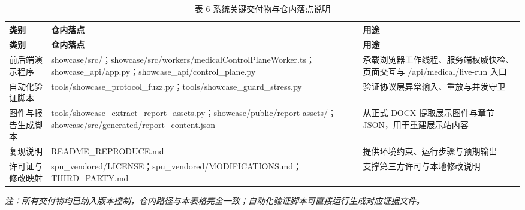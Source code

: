 \begin{longtable}{>{\raggedright\arraybackslash}p{}>{\raggedright\arraybackslash}p{}>{\raggedright\arraybackslash}p{}}
\caption{表 6 系统关键交付物与仓内落点说明}\\
\toprule
\textbf{类别} & \textbf{仓内落点} & \textbf{用途} \\
\midrule
\endfirsthead
\toprule
\textbf{类别} & \textbf{仓内落点} & \textbf{用途} \\
\midrule
\endhead
前后端演示程序 & showcase/src/；showcase/src/workers/medicalControlPlaneWorker.ts；showcase\_api/app.py；showcase\_api/control\_plane.py & 承载浏览器工作线程、服务端权威快检、页面交互与 /api/medical/live-run 入口 \\
自动化验证脚本 & tools/showcase\_protocol\_fuzz.py；tools/showcase\_guard\_stress.py & 验证协议层异常输入、重放与并发守卫 \\
图件与报告生成脚本 & tools/showcase\_extract\_report\_assets.py；showcase/public/report-assets/；showcase/src/generated/report\_content.json & 从正式 DOCX 提取展示图件与章节 JSON，用于重建展示站内容 \\
复现说明 & README\_REPRODUCE.md & 提供环境约束、运行步骤与预期输出 \\
许可证与修改映射 & spu\_vendored/LICENSE；spu\_vendored/MODIFICATIONS.md；THIRD\_PARTY.md & 支撑第三方许可与本地修改说明 \\
\bottomrule
\end{longtable}

\noindent\textit{注：所有交付物均已纳入版本控制，仓内路径与本表格完全一致；自动化验证脚本可直接运行生成对应证据文件。}
